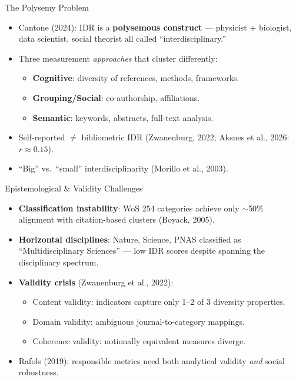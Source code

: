 \documentclass[aspectratio=169,10pt]{beamer}
\begin{document}
\begin{frame}{The Polysemy Problem}
\begin{itemize}
  \item Cantone (2024): IDR is a \textbf{polysemous construct} ---
        physicist + biologist, data scientist, social theorist all called
        ``interdisciplinary.''
  \item Three measurement \emph{approaches} that cluster differently:
  \begin{itemize}
    \item \textbf{Cognitive}: diversity of references, methods, frameworks.
    \item \textbf{Grouping/Social}: co-authorship, affiliations.
    \item \textbf{Semantic}: keywords, abstracts, full-text analysis.
  \end{itemize}
  \item Self-reported $\neq$ bibliometric IDR (Zwanenburg, 2022;
        Aksnes et al., 2026: $r \approx 0.15$).
  \item ``Big'' vs.\ ``small'' interdisciplinarity
        (Morillo et al., 2003).
\end{itemize}
\end{frame}

\begin{frame}{Epistemological \& Validity Challenges}
\begin{itemize}
  \item \textbf{Classification instability}: WoS 254 categories achieve
        only $\sim$50\% alignment with citation-based clusters (Boyack, 2005).
  \item \textbf{Horizontal disciplines}: Nature, Science, PNAS classified
        as ``Multidisciplinary Sciences'' --- low IDR scores despite
        spanning the disciplinary spectrum.
  \item \textbf{Validity crisis} (Zwanenburg et al., 2022):
  \begin{itemize}
    \item Content validity: indicators capture only 1--2 of 3 diversity properties.
    \item Domain validity: ambiguous journal-to-category mappings.
    \item Coherence validity: notionally equivalent measures diverge.
  \end{itemize}
  \item Rafols (2019): responsible metrics need both analytical validity
        \emph{and} social robustness.
\end{itemize}
\end{frame}
\end{document}
